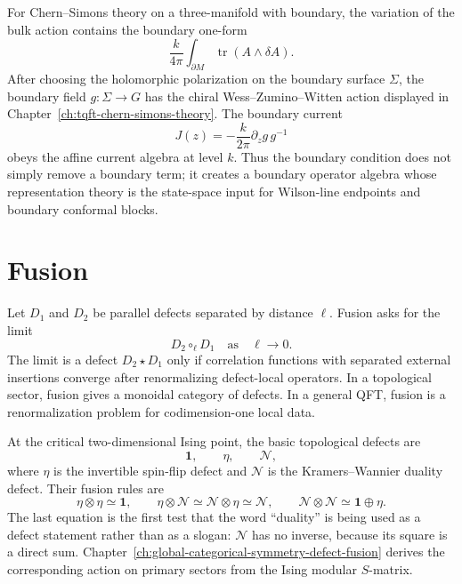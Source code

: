 \begin{example}
\label{ex:cs-boundary-wzw-global-chapter}
For Chern--Simons theory on a three-manifold with boundary, the variation of
the bulk action contains the boundary one-form
\[
  \frac{k}{4\pi}\int_{\partial M}\operatorname{tr}(A\wedge\delta A).
\]
After choosing the holomorphic polarization on the boundary surface
\(\Sigma\), the boundary field \(g:\Sigma\to G\) has the chiral
Wess--Zumino--Witten action displayed in
Chapter~\ref{ch:tqft-chern-simons-theory}.  The boundary current
\[
  J(z)=-\frac{k}{2\pi}\partial_zg\,g^{-1}
\]
obeys the affine current algebra at level \(k\).  Thus the boundary condition
does not simply remove a boundary term; it creates a boundary operator
algebra whose representation theory is the state-space input for Wilson-line
endpoints and boundary conformal blocks.
\end{example}

\section{Fusion}

\begin{definition}
\label{def:renormalized-defect-fusion}
Let \(D_1\) and \(D_2\) be parallel defects separated by distance \(\ell\).
Fusion asks for the limit
\[
  D_2\circ_\ell D_1\quad \text{as}\quad \ell\to0 .
\]
The limit is a defect \(D_2\star D_1\) only if correlation functions with
separated external insertions converge after renormalizing defect-local
operators.  In a topological sector, fusion gives a monoidal category of
defects.  In a general QFT, fusion is a renormalization problem for
codimension-one local data.
\end{definition}

\begin{example}
\label{ex:ising-defect-fusion-global-boundaries}
At the critical two-dimensional Ising point, the basic topological defects
are
\[
  \mathbf 1,\qquad \eta,\qquad \mathcal N,
\]
where \(\eta\) is the invertible spin-flip defect and \(\mathcal N\) is the
Kramers--Wannier duality defect.  Their fusion rules are
\[
  \eta\otimes\eta\simeq\mathbf 1,\qquad
  \eta\otimes\mathcal N\simeq\mathcal N\otimes\eta\simeq\mathcal N,
  \qquad
  \mathcal N\otimes\mathcal N\simeq\mathbf 1\oplus\eta .
\]
The last equation is the first test that the word ``duality'' is being used
as a defect statement rather than as a slogan: \(\mathcal N\) has no inverse,
because its square is a direct sum.  Chapter~\ref{ch:global-categorical-symmetry-defect-fusion}
derives the corresponding action on primary sectors from the Ising modular
\(S\)-matrix.
\end{example}

